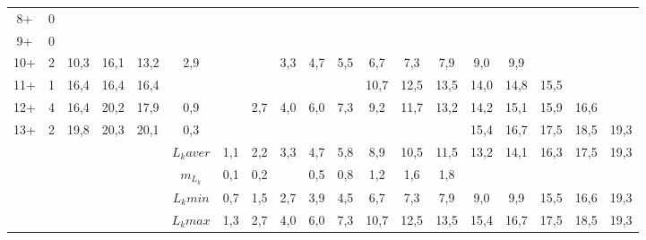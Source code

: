 \begin{landscape}
\begin{table}[h]
\begin{tabular}{|c|c|cc|cc|ccccccccccccc|}
8+      & 0  &       &       &         &         &     &     &     &     &     &      &      &      &      &      &      &      &      \\
9+      & 0  &       &       &         &         &     &     &     &     &     &      &      &      &      &      &      &      &      \\
10+     & 2  & 10,3  & 16,1  & 13,2    & 2,9     &     &     & 3,3 & 4,7 & 5,5 & 6,7  & 7,3  & 7,9  & 9,0  & 9,9  &      &      &      \\
11+     & 1  & 16,4  & 16,4  & 16,4    &         &     &     &     &     &     & 10,7 & 12,5 & 13,5 & 14,0 & 14,8 & 15,5 &      &      \\
12+     & 4  & 16,4  & 20,2  & 17,9    & 0,9     &     & 2,7 & 4,0 & 6,0 & 7,3 & 9,2  & 11,7 & 13,2 & 14,2 & 15,1 & 15,9 & 16,6 &      \\
13+     & 2  & 19,8  & 20,3  & 20,1    & 0,3     &     &     &     &     &     &      &      &      & 15,4 & 16,7 & 17,5 & 18,5 & 19,3 \\ \hline
        &    &       &       &         & $L_k aver$ & 1,1 & 2,2 & 3,3 & 4,7 & 5,8 & 8,9  & 10,5 & 11,5 & 13,2 & 14,1 & 16,3 & 17,5 & 19,3 \\
        &    &       &       &         & $m_{L_k}$  & 0,1 & 0,2 &     & 0,5 & 0,8 & 1,2  & 1,6  & 1,8  &      &      &      &      &      \\
        &    &       &       &         & $L_k min$  & 0,7 & 1,5 & 2,7 & 3,9 & 4,5 & 6,7  & 7,3  & 7,9  & 9,0  & 9,9  & 15,5 & 16,6 & 19,3 \\
        &    &       &       &         & $L_k max$  & 1,3 & 2,7 & 4,0 & 6,0 & 7,3 & 10,7 & 12,5 & 13,5 & 15,4 & 16,7 & 17,5 & 18,5 & 19,3 \\ \hline
\end{tabular}
\end{table}


\end{landscape}
